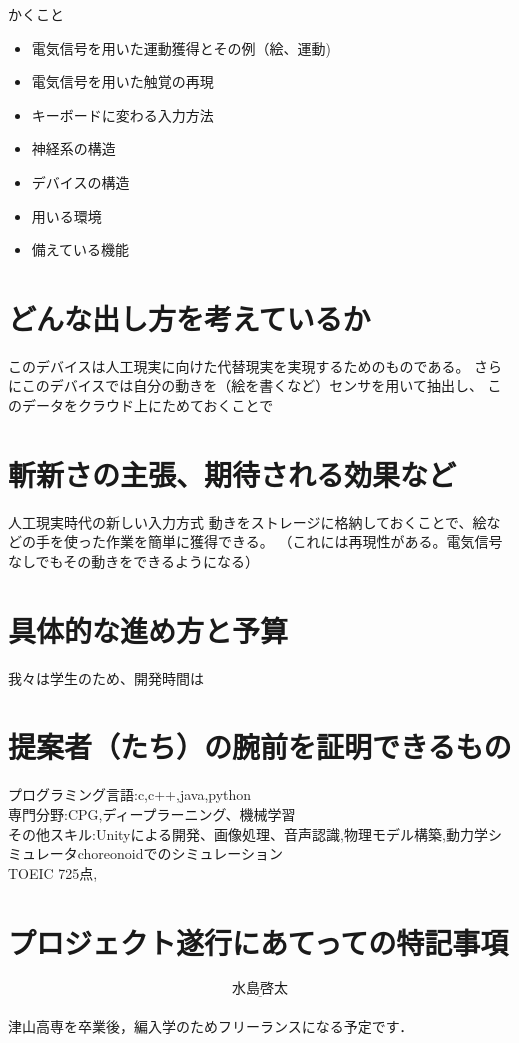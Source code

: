 \documentclass[11pt,onecolumn]{jsarticle}
\begin{document}
かくこと
\begin{itemize}
 \item 電気信号を用いた運動獲得とその例（絵、運動)
 \item 電気信号を用いた触覚の再現
 \item キーボードに変わる入力方法
 \item 神経系の構造
 \item デバイスの構造
 \item 用いる環境
 \item 備えている機能
\end{itemize}

\section{どんな出し方を考えているか}
このデバイスは人工現実に向けた代替現実を実現するためのものである。
さらにこのデバイスでは自分の動きを（絵を書くなど）センサを用いて抽出し、
このデータをクラウド上にためておくことで

\section{斬新さの主張、期待される効果など}
人工現実時代の新しい入力方式
動きをストレージに格納しておくことで、絵などの手を使った作業を簡単に獲得できる。
（これには再現性がある。電気信号なしでもその動きをできるようになる）



\section{具体的な進め方と予算}
我々は学生のため、開発時間は

\section{提案者（たち）の腕前を証明できるもの}
プログラミング言語:c,c++,java,python\\
専門分野:CPG,ディープラーニング、機械学習\\
その他スキル:Unityによる開発、画像処理、音声認識,物理モデル構築,動力学シミュレータchoreonoidでのシミュレーション\\
TOEIC 725点,


\section{プロジェクト遂行にあてっての特記事項}
\[
  \underline{水島啓太}
\]\\
津山高専を卒業後，編入学のためフリーランスになる予定です．
\end{document}
